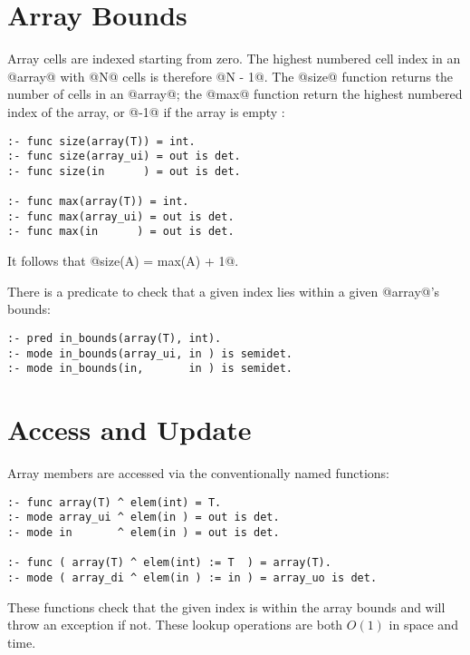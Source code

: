 \section{Array Bounds}


Array cells are indexed starting from zero.  The highest numbered cell
index in an @array@ with @N@ cells is therefore @N - 1@.  The @size@
function returns the number of cells in an @array@; the @max@ function
return the highest numbered index of the array, or @-1@ if the array is
empty :
\begin{verbatim}
:- func size(array(T)) = int.
:- func size(array_ui) = out is det.
:- func size(in      ) = out is det.

:- func max(array(T)) = int.
:- func max(array_ui) = out is det.
:- func max(in      ) = out is det.
\end{verbatim}
It follows that @size(A) = max(A) + 1@.

There is a predicate to check that a given index lies within a given
@array@'s bounds:
\begin{verbatim}
:- pred in_bounds(array(T), int).
:- mode in_bounds(array_ui, in ) is semidet.
:- mode in_bounds(in,       in ) is semidet.
\end{verbatim}

\section{Access and Update}

Array members are accessed via the conventionally named functions:
\begin{verbatim}
:- func array(T) ^ elem(int) = T.
:- mode array_ui ^ elem(in ) = out is det.
:- mode in       ^ elem(in ) = out is det.

:- func ( array(T) ^ elem(int) := T  ) = array(T).
:- mode ( array_di ^ elem(in ) := in ) = array_uo is det.
\end{verbatim}
These functions check that the given index is within the array bounds
and will throw an exception if not.  These lookup operations are both
$O(1)$ in space and time.  


